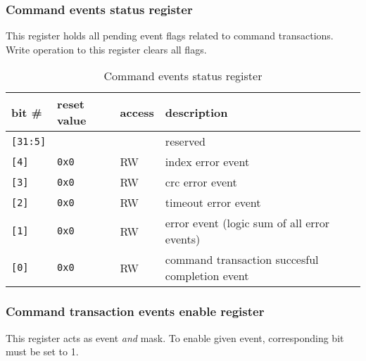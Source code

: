     \subsubsection{Command events status register}
    \label{sec:cmd_evt_reg}
    
    This register holds all pending event flags related to command transactions. Write operation to this register
    clears all flags.
    
    \begin{table}[H]
    \caption{Command events status register}
        \begin{tabular}{m{1.3cm}|m{2cm}|m{1cm}|m{8cm}}
                \rowcolor[gray]{0.7} bit \# & reset value & access & description \\ \hline \hline
                \texttt{[31:5]} & & & reserved \\ \hline
                \texttt{[4]} & \texttt{0x0} & RW & index error event \\ \hline
                \texttt{[3]} & \texttt{0x0} & RW & crc error event \\ \hline
                \texttt{[2]} & \texttt{0x0} & RW & timeout error event \\ \hline
                \texttt{[1]} & \texttt{0x0} & RW & error event (logic sum of all error events) \\ \hline
                \texttt{[0]} & \texttt{0x0} & RW & command transaction succesful completion event \\ \hline
                \hline
        \end{tabular}
        \label{tab:cmd_evt_reg}
    \end{table}
    
    \subsubsection{Command transaction events enable register}
    \label{sec:cmd_ena_reg}
    
    This register acts as event \textit{and} mask. To enable given event, corresponding bit must be set to 1.
    
